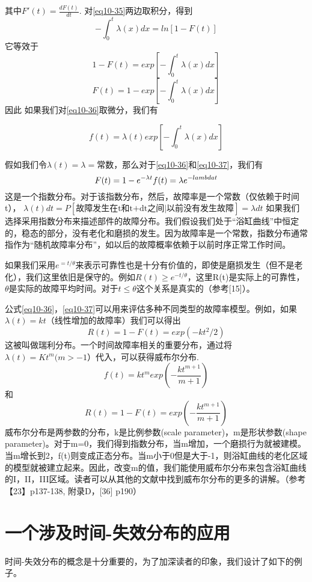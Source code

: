 \documentclass[cn,11pt,chinese]{elegantbook}
\begin{document}
{其中$F'(t)=\frac{dF(t)}{dt}$.
对\ref{eq10-35}两边取积分，得到
$$-\int_0^t \lambda(x)dx=ln[1-F(t)]$$
它等效于
$$1-F(t)=exp[-\int_0^t\lambda (x)dx]$$
\begin{equation}\label{eq10-36}
F(t)=1-exp[-\int_0^t\lambda (x)dx] 
\end{equation}
因此
如果我们对\ref{eq10-36}取微分，我们有

\begin{equation}\label{eq10-37}
f(t)=\lambda (t)exp[-\int_0^t\lambda (x)dx] 
\end{equation}

假如我们令$\lambda(t)=\lambda=\mbox{常数}$，那么对于\ref{eq10-36}和\ref{eq10-37}，我们有
$$F(t)=1-e^{-\lambda t} \\
f(t)=\lambda e^{-lambda t}$$
这是一个指数分布。对于该指数分布，然后，故障率是一个常数（仅依赖于时间t），
$\lambda(t)dt=P[\mbox{故障发生在t和t+dt之间} | \mbox{以前没有发生故障}]=\lambda dt$
如果我们选择采用指数分布来描述部件的故障分布。我们假设我们处于“浴缸曲线”中恒定的，稳态的部分，没有老化和磨损的发生。因为故障率是一个常数，指数分布通常指作为“随机故障率分布”，如以后的故障概率依赖于以前时序正常工作时间。

如果我们采用$e^{=t/\theta}$来表示可靠性也是十分有价值的，即使是磨损发生（但不是老化），我们这里依旧是保守的。例如$R(t)\geq e^{-t/\theta}$，这里R(t)是实际上的可靠性，$\theta$是实际的故障平均时间。对于$t \leq \theta$这个关系是真实的（参考[15]）。

公式\ref{eq10-36}，\ref{eq10-37}可以用来评估多种不同类型的故障率模型。例如，如果$\lambda(t)=kt$（线性增加的故障率）我们可以得出
$$R(t)=1-F(t)=exp(-kt^2/2)$$
这被叫做瑞利分布。一个时间故障率相关的重要分布，通过将$\lambda (t)=Kt^m (m>-1）$代入，可以获得威布尔分布.
$$f(t)=kt^mexp(-\frac{kt^{m+1}}{m+1})$$
和
$$R(t)=1-F(t)=exp(-\frac{kt^{m+1}}{m+1})$$
威布尔分布是两参数的分布，k是比例参数(scale parameter)，m是形状参数(shape parameter)。对于m=0，我们得到指数分布，当m增加，一个磨损行为就被建模。当m增长到2，f(t)则变成正态分布。当m小于0但是大于-1，则浴缸曲线的老化区域的模型就被建立起来。因此，改变m的值，我们能使用威布尔分布来包含浴缸曲线的I，II，III区域。读者可以从其他的文献中找到威布尔分布的更多的讲解。（参考【23】p137-138, 附录D，[36] p190）

\section{一个涉及时间-失效分布的应用}

时间-失效分布的概念是十分重要的，为了加深读者的印象，我们设计了如下的例子。

}
\end{document}
